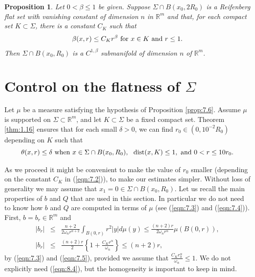 \documentclass[12pt,leqno]{article}
\newcommand{\RR}{\mathbb{R}}
\newcommand{\dist}{\mathrm{dist}}
\theoremstyle{plain}
\newtheorem{prop}[thm]{Proposition}
{\theorembodyfont{\rmfamily}
\newtheorem{defn}[thm]{Definition}}
{\theorembodyfont{\rmfamily}
\newtheorem{rem}[thm]{Remark}}
\numberwithin{equation}{section}
\begin{document}
\begin{prop}\label{prop:9.1}
Let $0<\beta\le 1$ be given. Suppose $\Sigma\cap B(x_0, 2R_0)$ is
a Reifenberg flat set with
vanishing constant of dimension $n$ in $\RR^m$ and that, for each
compact set $K\subset\Sigma$, there is a constant $C_K$ such that
\begin{equation}\label{eqn:9.2}
\beta(x,r)\le C_Kr^\beta\hbox{ for }x\in K\hbox{ and }r\le 1.
\end{equation}
Then $\Sigma\cap B(x_0, R_0)$ is a $C^{1,\beta}$
submanifold of dimension $n$ of $\RR^m$.
\end{prop}





\section{Control on the flatness of $\Sigma$}

Let $\mu$ be a measure satisfying the hypothesis of Proposition
\ref{prop:7.6}. Assume
$\mu$ is supported on $\Sigma\subset\RR^m$,
and let $K\subset \Sigma$ be a fixed
compact set. Theorem \ref{thm:1.16} ensures that
for each small $\delta>0$, we can find $r_0\in(0,10^{-2}R_0)$ depending on $K$
such that
\begin{equation}\label{eqn:8.3}
\theta(x,r)\le\delta\hbox{ when }x\in\Sigma\cap B(x_0, R_0), \ \
\dist(x,K)\le 1,\hbox{ and
}0<r\le 10 r_0.
\end{equation}

As we proceed it might be
convenient to make the value of $r_0$ smaller (depending on the
constant $C_K$ in (\ref{eqn:7.2})), to make our estimates simpler. Without
loss of generality we may assume that $x_1=0\in \Sigma\cap B(x_0, R_0)$.
Let us recall the main
properties of $b$ and $Q$ that are used in this section. In particular we do
not need to know how $b$ and $Q$ are computed in terms of $\mu$ (see
(\ref{eqn:7.3}) and (\ref{eqn:7.4})). First,
$b=b_r\in\RR^{m}$ and
\begin{eqnarray}\label{eqn:8.4}
|b_r| & \le & \frac{n+2}{2\omega_nr^{n+2}}\int_{B(0,r)}r^2|y|d\mu(y)
 \le  \frac{(n+2)r}{2\omega_nr^n}\mu(B(0,r)), \\
|b_r|& \le & \frac{(n+2)r}{2}\left\{1+\frac{C_Kr^\alpha}{\omega_n}\right\}\le (n+2)r,
\nonumber
\end{eqnarray}
by (\ref{eqn:7.3}) and (\ref{eqn:7.5}), provided we assume that
$\frac{C_Kr^\alpha_0}{\omega_n}\le 1$. We do not explicitly need (\ref{eqn:8.4}), but the
homogeneity is important to keep in mind.
\end{document}
